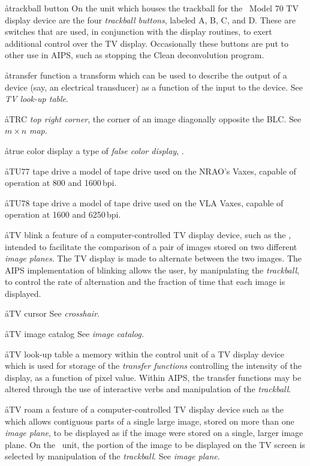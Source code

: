 \aa{trackball button}
On the unit which houses the trackball for the \iis\ Model 70
TV display device are the four {\it trackball buttons},
labeled A, B, C, and D.
These are switches that are used, in conjunction with the display
routines, to exert additional control over the TV display.
Occasionally these buttons are put to other use in AIPS, such as
stopping the Clean deconvolution program.

\aa{transfer function}
a transform which can be used to describe the output of a device (say, an
electrical transducer) as a function of the input to the device.
See {\it TV look-up table}.

\aa{TRC}
{\it top right corner}, the corner of an image diagonally opposite the BLC.
See $m\times n$ {\it map}.

\aa{true color display}
a type of {\it false color display}, \qv.

\aa{TU77 tape drive}
a model of tape drive used on the NRAO's Vaxes,
capable of operation at 800 and 1600\,bpi.

\aa{TU78 tape drive}
a model of tape drive used on the VLA Vaxes,
capable of operation at 1600 and 6250\,bpi.

\aa{TV blink}
a feature of a computer-controlled TV display device,
such as the {\it\iis}\/, intended to facilitate the comparison
of a pair of images stored on two different {\it image planes}.
The TV display is made to alternate between the two images.
The AIPS implementation of blinking allows the user,
by manipulating the {\it trackball}\/, to control
the rate of alternation and the fraction of time that
each image is displayed.

\aa{TV cursor} See {\it crosshair}.

\aa{TV image catalog} See {\it image catalog.}

\aa{TV look-up table}
a memory within the control unit of a TV display device which is used
for storage of the {\it transfer functions} controlling the intensity of
the display, as a function of pixel value.
Within AIPS, the transfer functions may be altered through
the use of interactive verbs
and manipulation of the {\it trackball}.

\aa{TV roam}
a feature of a computer-controlled TV display device such as the {\it\iis}\ %
which allows contiguous parts of a single large image,
stored on more than one {\it image plane}, to be displayed
as if the image were stored on a single, larger image plane.
On the \iis\ unit, the portion of the image to be displayed
on the TV screen is selected by manipulation of the {\it trackball}.
See {\it image plane}.

